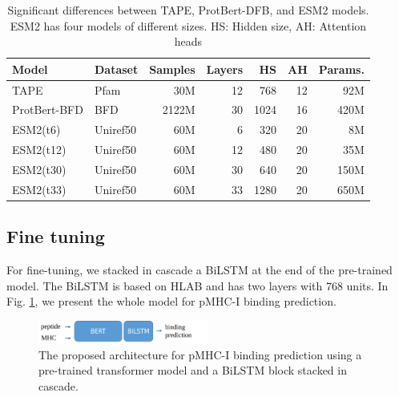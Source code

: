 \begin{table}[]%
	\centering
	\caption{Significant differences between TAPE, ProtBert-DFB, and ESM2 models. ESM2 has four models of different sizes. HS: Hidden size, AH: Attention heads}
	\label{tab:pretrained}%
	\scriptsize
	\begin{tabular}{llrrrrr}
		\hline
		\textbf{Model}   & \textbf{Dataset} & \textbf{Samples} & \textbf{Layers} & \textbf{HS} & \textbf{AH} & \textbf{Params.} \\
		\hline
		TAPE             & Pfam             & 30M                   & 12              & 768                  & 12                       & 92M                 \\
		ProtBert-BFD     & BFD              & 2122M                 & 30              & 1024                 & 16                       & 420M                \\
		ESM2(t6)  & Uniref50         & 60M                   & 6               & 320                  & 20                       & 8M                  \\
		ESM2(t12)  & Uniref50         & 60M                   & 12              & 480                  & 20                       & 35M                 \\
		ESM2(t30) & Uniref50         & 60M                   & 30              & 640                  & 20                       & 150M                \\
		ESM2(t33)  & Uniref50         & 60M                   & 33              & 1280                 & 20                       & 650M               \\
		\hline
	\end{tabular}
	
\end{table}
 
 
 \subsection{Fine tuning}\label{sec:fine-tuned}
 
 For fine-tuning, we stacked in cascade a BiLSTM at the end of the pre-trained model. The BiLSTM is based on HLAB \cite{zhang2022hlab} and has two layers with 768 units.  In Fig. \ref{fig:finetune}, we present the whole model for pMHC-I binding prediction. 
 
 
 
 
 \begin{figure}[h]
 	\centering
	\includegraphics[width=0.5\textwidth]{../img/proposal/pMHC}	
 	
 	\caption{The proposed architecture for pMHC-I binding prediction using a pre-trained transformer model and a BiLSTM block stacked in cascade.}
 	\label{fig:finetune}
 \end{figure}
 
